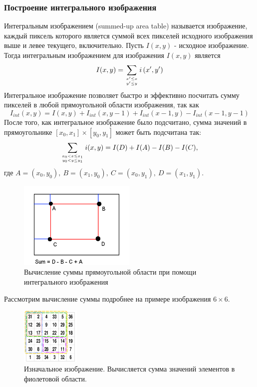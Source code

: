 \subsubsection{Построение интегрального изображения}
Интегральным изображением \cite{bradley2007adaptive} (summed-up area table) называется изображение, каждый пиксель которого является суммой всех пикселей исходного изображения выше и левее текущего, включительно. Пусть $I(x, y)$ - исходное изображение. Тогда интегральным изображением для изображения $I(x, y)$ является
$$
I(x, y)=\sum_{x^{\prime} \leq x \atop y^{\prime} \leq y} i\left(x^{\prime}, y^{\prime}\right)
$$
Интегральное изображение позволяет быстро и эффективно посчитать сумму пикселей в любой прямоугольной области изображения, так как
$$
I_{int}(x, y)=I(x, y)+I_{int}(x, y-1)+I_{int}(x-1, y)-I_{int}(x-1, y-1)
$$
После того, как интегральное изображение было подсчитано, сумма значений в прямоугольнике $[x_0, x_1] \times [y_0, y_1]$ может быть подсчитана так:
$$
\sum_{x_{0}<x \leq x_{1} \atop y_{0}<y \leq y_{1}} i(x, y)=I(D)+I(A)-I(B)-I(C),
$$
где $A=(x_0, y_0),~B=(x_1, y_0),~C=(x_0, y_1),~D=(x_1, y_1).$
\newline
\begin{figure}[H]
    \centering
    \includegraphics[width=0.5\textwidth]{pics/Summed_area_table.png}
    \caption{Вычисление суммы прямоугольной области при помощи интегрального изображения}
    \label{fig:summed0}
\end{figure}
\newpage
Рассмотрим вычисление суммы подробнее на примере изображения $6 \times 6$.
\newline
\begin{figure}[H]
    \centering
    \includegraphics[width=0.25\textwidth]{pics/summedup1.png}
    \caption{Изначальное изображение. Вычисляется сумма значений элементов в фиолетовой области.}
    \label{fig:summed1}
\end{figure}
